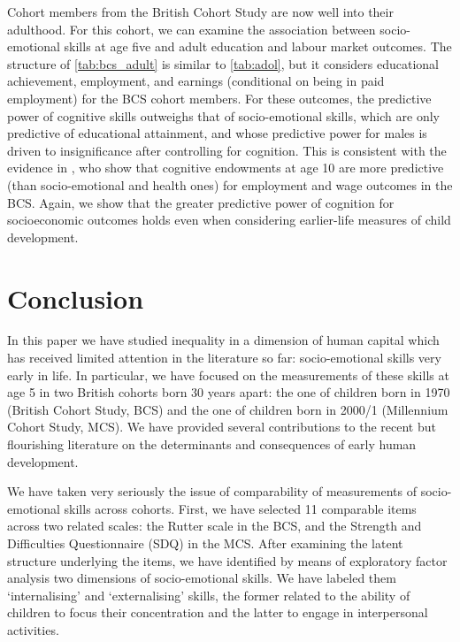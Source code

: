 Cohort members from the British Cohort Study are now well into their adulthood. For this cohort, we can examine the association between socio-emotional skills at age five and adult education and labour market outcomes. The structure of \autoref{tab:bcs_adult} is similar to \autoref{tab:adol}, but it considers educational achievement, employment, and earnings (conditional on being in paid employment) for the BCS cohort members. For these outcomes, the predictive power of cognitive skills outweighs that of socio-emotional skills, which are only predictive of educational attainment, and whose predictive power for males is driven to insignificance after controlling for cognition. This is consistent with the evidence in  \citet{Conti2011}, who show that cognitive endowments at age 10 are more predictive (than socio-emotional and health ones) for employment and wage outcomes in the BCS. Again, we show that the greater predictive power of cognition for socioeconomic outcomes holds even when considering earlier-life measures of child development. 

\section{Conclusion}\label{sec:conclusions}

In this paper we have studied inequality in a dimension of human capital which has received limited attention in the literature so far: socio-emotional skills very early in life. In particular, we have focused on the measurements of these skills at age 5 in two British cohorts born 30 years apart: the one of children born in 1970 (British Cohort Study, BCS) and the one of children born in 2000/1 (Millennium Cohort Study, MCS). We have provided several contributions to the recent but flourishing literature on the determinants and consequences of early human development.

We have taken very seriously the issue of comparability of measurements of socio-emotional skills across cohorts. First, we have selected 11 comparable items across two related scales: the Rutter scale in the BCS, and the Strength and Difficulties Questionnaire (SDQ) in the MCS. After examining the latent structure underlying the items, we have identified by means of exploratory factor analysis two dimensions of socio-emotional skills. We have labeled them `internalising' and `externalising' skills, the former related to the ability of children to focus their concentration and the latter to engage in interpersonal activities.

